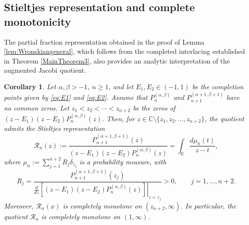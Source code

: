 \documentclass[final,3p,times,12pt]{elsarticle}
\newtheorem{corollary}{Corollary}[section]
\numberwithin{equation}{section}  %
\begin{document}
\subsection{Stieltjes representation and complete monotonicity}\label{Stieltjes}

The partial fraction representation obtained in the proof of  Lemma \ref{lem:Wronskiangeneral}, which follows from the completed
interlacing established in Theorem \ref{MainTheorem3}, also provides an analytic interpretation of the augmented Jacobi quotient.

\begin{corollary}	\label{cor:JacobiStieltjesCM}
	Let $\alpha,\beta>-1$, $n\ge1$, and let $E_1,E_2\in(-1,1)$
	be the completion points given by \eqref{eq:E1} and \eqref{eq:E2}. Assume that $P_n^{(\alpha,\beta)}$ and $P_{n+1}^{(\alpha+1,\beta+1)}$  have no common zeros. Let $	z_1<z_2<\cdots<z_{n+2}$	be the zeros of $	(z-E_1)(z-E_2)P_n^{(\alpha,\beta)}(z).$	Then, for $z\in \mathbb{C}\setminus\{z_1,z_2,...,z_{n+2}\}$, the quotient 	admits the Stieltjes representation
	\begin{equation}	\label{eq:JacobiStieltjesRepresentation}
		\mathcal R_n(z)	:=	\frac{	P_{n+1}^{(\alpha+1,\beta+1)}(z)	}{
			(z-E_1)(z-E_2)P_n^{(\alpha,\beta)}(z)}=	\int_{\mathbb R}\frac{d\mu_n(t)}{z-t},
	\end{equation}
	where $	\mu_n	:=
	\sum_{j=1}^{n+2}R_j\delta_{z_j}$
	is a  probability measure, with
	\begin{equation}	\label{eq:JacobiStieltjesWeights}
		R_j	=	\frac{	P_{n+1}^{(\alpha+1,\beta+1)}(z_j)}{	\left.\displaystyle\frac{d}{dz}
			\left[	(z-E_1)(z-E_2)P_n^{(\alpha,\beta)}(z)\right]
			\right|_{z=z_j}	}>0,
		\qquad
		j=1,\ldots,n+2.
	\end{equation}
	Moreover, $\mathcal{R}_n(x)$ is completely monotone on $(z_{n+2},\infty)$.
	In particular, the quotient $\mathcal{R}_n$ is completely monotone on $(1,\infty)$.
\end{corollary}
\end{document}
